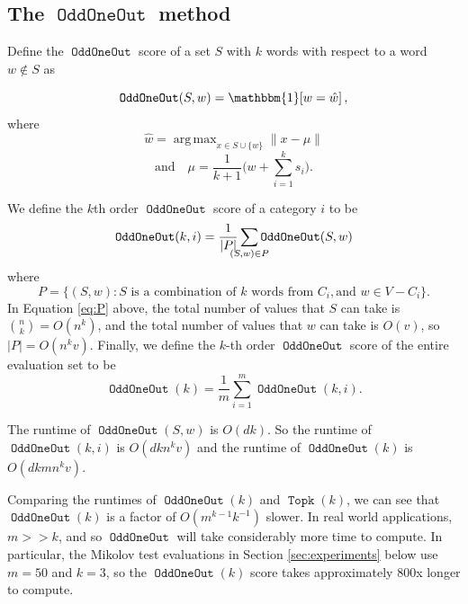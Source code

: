 \documentclass[11pt,a4paper]{article}
\newcommand{\ltwo}[1]{\lVert{#1}\rVert}
\newcommand{\indicator}[1]{\mathbbm{1}\!\left[{#1}\right]}
\DeclareMathOperator*{\argmax}{arg\,max}
\DeclareMathOperator{\OddOneOut}{\texttt{OddOneOut}}
\DeclareMathOperator{\topk}{\texttt{Topk}}
\begin{document}
\subsection{The $\OddOneOut$ method}
Define the $\OddOneOut$ score of a set $S$ with $k$ words with respect to a word $w\not\in S$ as


\begin{equation}
    \OddOneOut(S,w) = \indicator{w = \hat w},
\end{equation}
where
\begin{equation}
    \hat w = \argmax_{x \in S\cup\{w\}} \ltwo{x - \mu}
\end{equation}
\begin{equation}
    \text{and}
    \quad
    \mu = \frac1{k+1}\bigg(w + \sum_{i=1}^k{s_i}\bigg)
    .
\end{equation}


We define the $k$th order $\OddOneOut$ score of a category $i$ to be
\begin{equation}
    \OddOneOut(k,i) = \frac 1 {|P|} \sum_{\mathclap{(S,w) \in P}} \OddOneOut(S,w)
\end{equation}
where
\begin{equation}
    P = \{ (S, w) : S \text{~is a combination of $k$ words from $C_i$}, \text{and~} w \in V-C_i \}
    .
    \label{eq:P}
\end{equation}
In Equation \eqref{eq:P} above,
the total number of values that $S$ can take is ${n \choose k} = O(n^k)$,
and the total number of values that $w$ can take is $O(v)$,
so $|P| = O(n^kv)$.
Finally, we define the $k$-th order $\OddOneOut$ score of the entire evaluation set to be
\begin{equation}
    \OddOneOut(k) = \frac 1 m \sum_{i=1}^m \OddOneOut(k,i)
    .
\end{equation}

The runtime of $\OddOneOut(S,w)$ is $O(dk)$.
So the runtime of $\OddOneOut(k,i)$ is $O(dkn^kv)$ and the runtime of $\OddOneOut(k)$ is $O(dkmn^kv)$.

Comparing the runtimes of $\OddOneOut(k)$ and $\topk(k)$, we can see that $\OddOneOut(k)$ is a factor of $O(m^{k-1}k^{-1})$ slower.
In real world applications, $m >\!\!> k$, and so $\OddOneOut$ will take considerably more time to compute.
In particular, the Mikolov test evaluations in Section \ref{sec:experiments} below use $m=50$ and $k=3$,
so the $\OddOneOut(k)$ score takes approximately 800x longer to compute.
\end{document}
